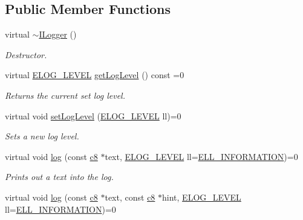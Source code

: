 \subsection*{Public Member Functions}
\begin{DoxyCompactItemize}
\item 
\mbox{\label{classirr_1_1ILogger_ae1ceda88c9b97cc1efcefa38588f9116}} 
virtual \hyperlink{classirr_1_1ILogger_ae1ceda88c9b97cc1efcefa38588f9116}{$\sim$\+I\+Logger} ()
\begin{DoxyCompactList}\small\item\em Destructor. \end{DoxyCompactList}\item 
\mbox{\label{classirr_1_1ILogger_af32c91dd813853eb0d72c10b5d774b93}} 
virtual \hyperlink{namespaceirr_aa2d1cac68606a25ed24cfffccfa30a92}{E\+L\+O\+G\+\_\+\+L\+E\+V\+EL} \hyperlink{classirr_1_1ILogger_af32c91dd813853eb0d72c10b5d774b93}{get\+Log\+Level} () const =0
\begin{DoxyCompactList}\small\item\em Returns the current set log level. \end{DoxyCompactList}\item 
virtual void \hyperlink{classirr_1_1ILogger_a226a6f71f76970f2d846a10599f2e5ec}{set\+Log\+Level} (\hyperlink{namespaceirr_aa2d1cac68606a25ed24cfffccfa30a92}{E\+L\+O\+G\+\_\+\+L\+E\+V\+EL} ll)=0
\begin{DoxyCompactList}\small\item\em Sets a new log level. \end{DoxyCompactList}\item 
virtual void \hyperlink{classirr_1_1ILogger_acbbc214a06cd968409000f55aa76c82f}{log} (const \hyperlink{namespaceirr_a9395eaea339bcb546b319e9c96bf7410}{c8} $\ast$text, \hyperlink{namespaceirr_aa2d1cac68606a25ed24cfffccfa30a92}{E\+L\+O\+G\+\_\+\+L\+E\+V\+EL} ll=\hyperlink{namespaceirr_aa2d1cac68606a25ed24cfffccfa30a92a9d74de15737e326a91aec6f38c23f9cf}{E\+L\+L\+\_\+\+I\+N\+F\+O\+R\+M\+A\+T\+I\+ON})=0
\begin{DoxyCompactList}\small\item\em Prints out a text into the log. \end{DoxyCompactList}\item 
virtual void \hyperlink{classirr_1_1ILogger_afccb7b2bb0a9b0415204d63e2b0cf290}{log} (const \hyperlink{namespaceirr_a9395eaea339bcb546b319e9c96bf7410}{c8} $\ast$text, const \hyperlink{namespaceirr_a9395eaea339bcb546b319e9c96bf7410}{c8} $\ast$hint, \hyperlink{namespaceirr_aa2d1cac68606a25ed24cfffccfa30a92}{E\+L\+O\+G\+\_\+\+L\+E\+V\+EL} ll=\hyperlink{namespaceirr_aa2d1cac68606a25ed24cfffccfa30a92a9d74de15737e326a91aec6f38c23f9cf}{E\+L\+L\+\_\+\+I\+N\+F\+O\+R\+M\+A\+T\+I\+ON})=0

\end{DoxyCompactItemize}
